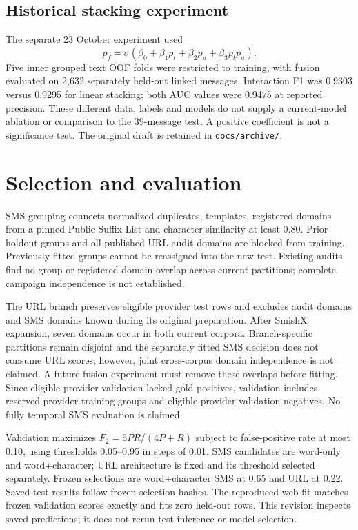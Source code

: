 \documentclass[11pt]{article}
\begin{document}
\subsection{Historical stacking experiment}
The separate 23 October experiment used
\[
p_f=\sigma(\beta_0+\beta_1p_t+\beta_2p_u+\beta_3p_tp_u).
\]
Five inner grouped text OOF folds were restricted to training, with fusion evaluated
on 2,632 separately held-out linked messages. Interaction F1 was 0.9303 versus
0.9295 for linear stacking; both AUC values were 0.9475 at reported precision.
These different data, labels and models do not supply a current-model ablation
or comparison to the 39-message test. A positive coefficient is not a significance
test. The original draft is retained in \texttt{docs/archive/}.

\section{Selection and evaluation}
SMS grouping connects normalized duplicates, templates, registered domains from
a pinned Public Suffix List and character similarity at least 0.80. Prior
holdout groups and all published URL-audit domains are blocked from training.
Previously fitted groups cannot be reassigned into the new test. Existing audits
find no group or registered-domain overlap across current partitions; complete
campaign independence is not established.

The URL branch preserves eligible provider test rows and excludes audit domains
and SMS domains known during its original preparation. After SmishX expansion,
seven domains occur in both current corpora. Branch-specific partitions remain
disjoint and the separately fitted SMS decision does not consume URL scores;
however, joint cross-corpus domain independence is not claimed. A future fusion
experiment must remove these overlaps before fitting. Since eligible provider
validation lacked gold positives, validation
includes reserved provider-training groups and eligible provider-validation
negatives. No fully temporal SMS evaluation is claimed.

Validation maximizes $F_2=5PR/(4P+R)$ subject to false-positive rate at most 0.10,
using thresholds 0.05--0.95 in steps of 0.01. SMS candidates are word-only and
word+character; URL architecture is fixed and its threshold selected separately.
Frozen selections are word+character SMS at 0.65 and URL at 0.22. Saved test results
follow frozen selection hashes. The reproduced web fit matches frozen validation
scores exactly and fits zero held-out rows. This revision inspects saved
predictions; it does not rerun test inference or model selection.
\end{document}
